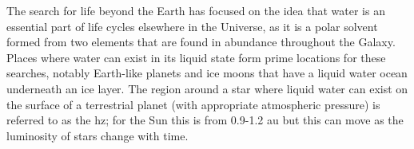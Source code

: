 \documentclass[letterpaper]{ar-1col}
\begin{document}
\begin{figure}[ht]
{%
}
  \label{fig:nstars}
\end{figure}





The search for life beyond the Earth has focused on the idea that water is an essential part of life cycles elsewhere in the Universe, as it is a polar solvent formed from two elements that are found in abundance throughout the Galaxy.
%
Places where water can exist in its liquid state form prime locations for these searches, notably Earth-like planets and ice moons that have a liquid water ocean underneath an ice layer.
%
The region around a star where liquid water can exist on the surface of a terrestrial planet (with appropriate atmospheric pressure) is referred to as the \acl{hz}; for the Sun this is from 0.9-1.2 au but this can move as the luminosity of stars change with time.
\end{document}
